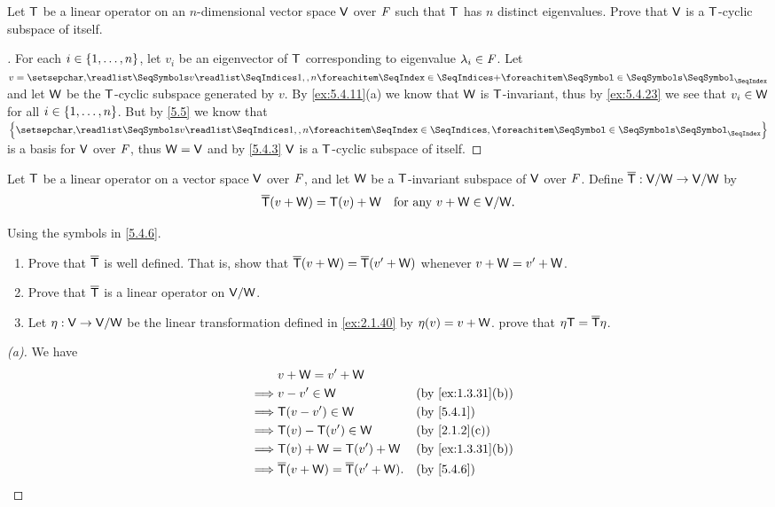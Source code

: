 \begin{ex}\label{ex:5.4.26}
	Let \(\mathsf{T}\) be a linear operator on an \(n\)-dimensional vector space \(\mathsf{V}\) over \(\mathit{F}\) such that \(\mathsf{T}\) has \(n\) distinct eigenvalues.
	Prove that \(\mathsf{V}\) is a \(\mathsf{T}\)-cyclic subspace of itself.
\end{ex}

\begin{proof}[]
	For each \(i \in \left\lbrace1, \dots, n\right\rbrace\), let \(v_i\) be an eigenvector of \(\mathsf{T}\) corresponding to eigenvalue \(\lambda_i \in \mathit{F}\).
	Let \(v = \seq[+]{v}{1,,n}\) and let \(\mathsf{W}\) be the \(\mathsf{T}\)-cyclic subspace generated by \(v\).
	By \cref{ex:5.4.11}(a) we know that \(\mathsf{W}\) is \(\mathsf{T}\)-invariant, thus by \cref{ex:5.4.23} we see that \(v_i \in \mathsf{W}\) for all \(i \in \left\lbrace1, \dots, n\right\rbrace\).
	But by \cref{5.5} we know that \(\set{\seq{v}{1,,n}}\) is a basis for \(\mathsf{V}\) over \(\mathit{F}\), thus \(\mathsf{W} = \mathsf{V}\) and by \cref{5.4.3} \(\mathsf{V}\) is a \(\mathsf{T}\)-cyclic subspace of itself.
\end{proof}

\begin{defn}\label{5.4.6}
	Let \(\mathsf{T}\) be a linear operator on a vector space \(\mathsf{V}\) over \(\mathit{F}\), and let \(\mathsf{W}\) be a \(\mathsf{T}\)-invariant subspace of \(\mathsf{V}\) over \(\mathit{F}\).
	Define \(\overline{\mathsf{T}} : \mathsf{V} / \mathsf{W} \to \mathsf{V} / \mathsf{W}\) by
	\[
		\overline{\mathsf{T}}(v + \mathsf{W}) = \mathsf{T}(v) + \mathsf{W} \quad \text{for any } v + \mathsf{W} \in \mathsf{V} / \mathsf{W}.
	\]
\end{defn}

\begin{ex}\label{ex:5.4.27}
	Using the symbols in \cref{5.4.6}.
	\begin{enumerate}
		\item Prove that \(\overline{\mathsf{T}}\) is well defined.
		      That is, show that \(\overline{\mathsf{T}}(v + \mathsf{W}) = \overline{\mathsf{T}}(v' + \mathsf{W})\) whenever \(v + \mathsf{W} = v' + \mathsf{W}\).
		\item Prove that \(\overline{\mathsf{T}}\) is a linear operator on \(\mathsf{V} / \mathsf{W}\).
		\item Let \(\eta : \mathsf{V} \to \mathsf{V} / \mathsf{W}\) be the linear transformation defined in \cref{ex:2.1.40} by \(\eta(v) = v + \mathsf{W}\).
		      prove that \(\eta \mathsf{T} = \overline{\mathsf{T}} \eta\).
	\end{enumerate}
\end{ex}

\begin{proof}[(a)]
	We have
	\begin{align*}
		         & v + \W = v' + \W                                                       \\
		\implies & v - v' \in \W                                   &  & \by{ex:1.3.31}[b] \\
		\implies & \T(v - v') \in \W                               &  & \by{5.4.1}        \\
		\implies & \T(v) - \T(v') \in \W                           &  & \by{2.1.2}[c]     \\
		\implies & \T(v) + \W = \T(v') + \W                        &  & \by{ex:1.3.31}[b] \\
		\implies & \overline{\T}(v + \W) = \overline{\T}(v' + \W). &  & \by{5.4.6}
	\end{align*}
\end{proof}

